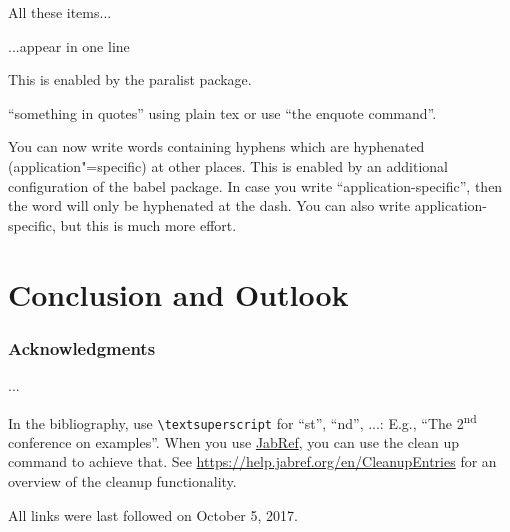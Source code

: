 \documentclass[runningheads,a4paper]{llncs}[2015/06/24]
\begin{document}
\begin{inparaenum}
  \item All these items...
  \item ...appear in one line
  \item This is enabled by the paralist package.
\end{inparaenum}

``something in quotes'' using plain tex or use \enquote{the enquote command}.

You can now write words containing hyphens which are hyphenated (application"=specific) at other places.
This is enabled by an additional configuration of the babel package.
In case you write \enquote{application-specific}, then the word will only be hyphenated at the dash.
You can also write applica\allowbreak{}tion-specific, but this is much more effort.

\section{Conclusion and Outlook}
\label{sec:outlook}

\blindtext[5]

\subsubsection*{Acknowledgments}
...

In the bibliography, use \texttt{\textbackslash textsuperscript} for ``st'', ``nd'', ...:
E.g., \enquote{The 2\textsuperscript{nd} conference on examples}.
When you use \href{https://www.jabref.org}{JabRef}, you can use the clean up command to achieve that.
See \url{https://help.jabref.org/en/CleanupEntries} for an overview of the cleanup functionality.




All links were last followed on October 5, 2017.
\end{document}
